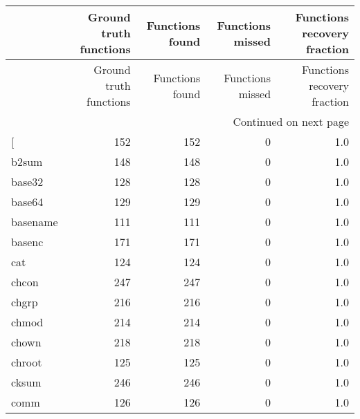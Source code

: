 \begin{longtable}{lrrrr}
\toprule
{} &  Ground truth functions &  Functions found &  Functions missed &  Functions recovery fraction \\
\midrule
\endfirsthead

\toprule
{} &  Ground truth functions &  Functions found &  Functions missed &  Functions recovery fraction \\
\midrule
\endhead
\midrule
\multicolumn{5}{r}{{Continued on next page}} \\
\midrule
\endfoot

\bottomrule
\endlastfoot
{[}         &                     152 &              152 &                 0 &                          1.0 \\
b2sum     &                     148 &              148 &                 0 &                          1.0 \\
base32    &                     128 &              128 &                 0 &                          1.0 \\
base64    &                     129 &              129 &                 0 &                          1.0 \\
basename  &                     111 &              111 &                 0 &                          1.0 \\
basenc    &                     171 &              171 &                 0 &                          1.0 \\
cat       &                     124 &              124 &                 0 &                          1.0 \\
chcon     &                     247 &              247 &                 0 &                          1.0 \\
chgrp     &                     216 &              216 &                 0 &                          1.0 \\
chmod     &                     214 &              214 &                 0 &                          1.0 \\
chown     &                     218 &              218 &                 0 &                          1.0 \\
chroot    &                     125 &              125 &                 0 &                          1.0 \\
cksum     &                     246 &              246 &                 0 &                          1.0 \\
comm      &                     126 &              126 &                 0 &                          1.0 \\

\end{longtable}
